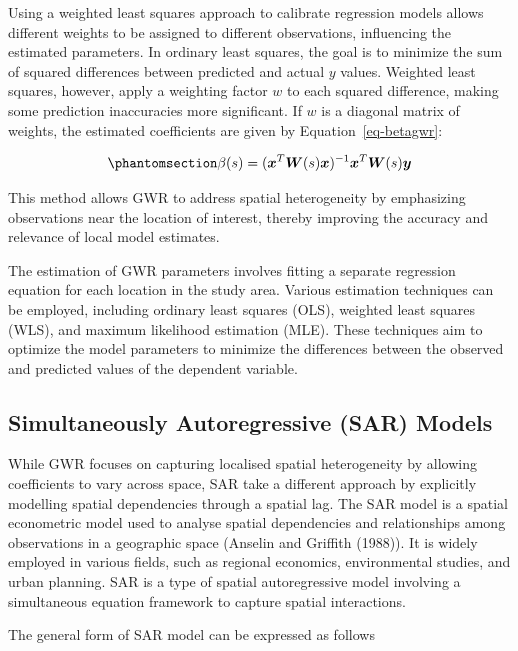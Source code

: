 \documentclass[
  default,
]{sn-jnl}
\begin{document}
Using a weighted least squares approach to calibrate regression models
allows different weights to be assigned to different observations,
influencing the estimated parameters. In ordinary least squares, the
goal is to minimize the sum of squared differences between predicted and
actual \(y\) values. Weighted least squares, however, apply a weighting
factor \(w\) to each squared difference, making some prediction
inaccuracies more significant. If \(w\) is a diagonal matrix of weights,
the estimated coefficients are given by Equation~\ref{eq-betagwr}:

\begin{equation}\phantomsection\label{eq-betagwr}{
\beta(s) = (\boldsymbol{x}^T \boldsymbol{W}(s) \boldsymbol{x})^{-1} \boldsymbol{x}^T \boldsymbol{W}(s) \boldsymbol{y}
}\end{equation}

This method allows GWR to address spatial heterogeneity by emphasizing
observations near the location of interest, thereby improving the
accuracy and relevance of local model estimates.

The estimation of GWR parameters involves fitting a separate regression
equation for each location in the study area. Various estimation
techniques can be employed, including ordinary least squares (OLS),
weighted least squares (WLS), and maximum likelihood estimation (MLE).
These techniques aim to optimize the model parameters to minimize the
differences between the observed and predicted values of the dependent
variable.

\subsection{Simultaneously Autoregressive (SAR)
Models}\label{simultaneously-autoregressive-sar-models}

While GWR focuses on capturing localised spatial heterogeneity by
allowing coefficients to vary across space, SAR take a different
approach by explicitly modelling spatial dependencies through a spatial
lag. The SAR model is a spatial econometric model used to analyse
spatial dependencies and relationships among observations in a
geographic space (Anselin and Griffith (1988)). It is widely employed in
various fields, such as regional economics, environmental studies, and
urban planning. SAR is a type of spatial autoregressive model involving
a simultaneous equation framework to capture spatial interactions.

The general form of SAR model can be expressed as follows
\end{document}
